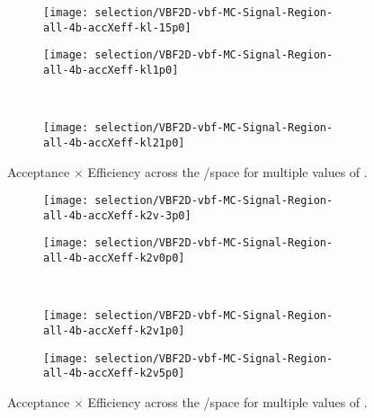         \begin{figure}[tbh]
            \begin{subfigure}{0.48\textwidth}
                \texttt{[image: selection/VBF2D-vbf-MC-Signal-Region-all-4b-accXeff-kl-15p0]}
                \caption{}
            \end{subfigure}
            \begin{subfigure}{0.48\textwidth}
                \texttt{[image: selection/VBF2D-vbf-MC-Signal-Region-all-4b-accXeff-kl1p0]}
                \caption{}
            \end{subfigure}\\
            \begin{subfigure}{0.48\textwidth}
                \texttt{[image: selection/VBF2D-vbf-MC-Signal-Region-all-4b-accXeff-kl21p0]}
                \caption{}
            \end{subfigure}
            \caption{
                Acceptance $\times$ Efficiency across the \kvv/\kv space for multiple values of \kl.
            }
            \label{fig:accXeff_kl}
        \end{figure}

        \begin{figure}[tbh]
            \begin{subfigure}{0.48\textwidth}
                \texttt{[image: selection/VBF2D-vbf-MC-Signal-Region-all-4b-accXeff-k2v-3p0]}
                \caption{}
            \end{subfigure}
            \begin{subfigure}{0.48\textwidth}
                \texttt{[image: selection/VBF2D-vbf-MC-Signal-Region-all-4b-accXeff-k2v0p0]}
                \caption{}
            \end{subfigure}\\
            \begin{subfigure}{0.48\textwidth}
                \texttt{[image: selection/VBF2D-vbf-MC-Signal-Region-all-4b-accXeff-k2v1p0]}
                \caption{}
            \end{subfigure}
            \begin{subfigure}{0.48\textwidth}
                \texttt{[image: selection/VBF2D-vbf-MC-Signal-Region-all-4b-accXeff-k2v5p0]}
                \caption{}
            \end{subfigure}
            \caption{
                Acceptance $\times$ Efficiency across the \kl/\kv space for multiple values of \kvv.
            }
            \label{fig:accXeff_kvv}
        \end{figure}

